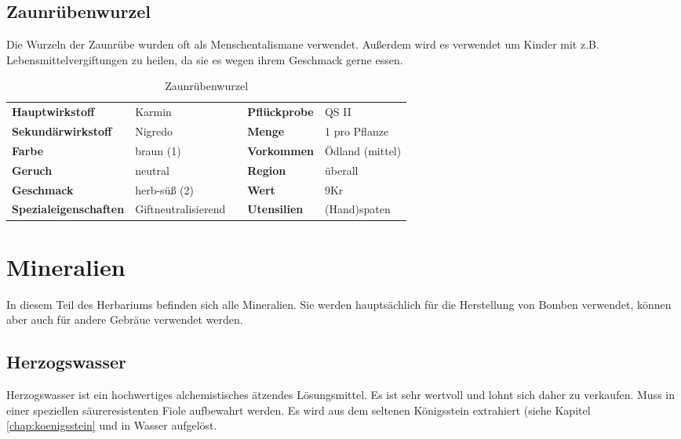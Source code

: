 \subsection{Zaunrübenwurzel}
Die Wurzeln der Zaunrübe wurden oft als Menschentalismane verwendet. Außerdem wird es verwendet um Kinder mit z.B. Lebensmittelvergiftungen zu heilen, da sie es wegen ihrem Geschmack gerne essen.

\begin{table}[H] 
\begin{center} 
\begin{tabular}{|l|l|p{1cm}|l|l|} 
  	\cline{1-2} \cline{4-5} 
  	\textbf{Hauptwirkstoff} & Karmin && \textbf{Pflückprobe} & QS II \\ \cline{1-2} \cline{4-5} 
  	\textbf{Sekundärwirkstoff} & Nigredo && \textbf{Menge} & 1 pro Pflanze \\ \cline{1-2} \cline{4-5} 
  	\textbf{Farbe} & braun (1) && \textbf{Vorkommen} & Ödland (mittel) \\ \cline{1-2} \cline{4-5} 
  	\textbf{Geruch} & neutral && \textbf{Region} & überall \\ \cline{1-2} \cline{4-5} 
  	\textbf{Geschmack} & herb-süß (2) && \textbf{Wert} & 9Kr \\ \cline{1-2} \cline{4-5} 
  	\textbf{Spezialeigenschaften} & Giftneutralisierend && \textbf{Utensilien} & (Hand)spaten \\ \cline{1-2} \cline{4-5} 
\end{tabular} 
\end{center} 
\caption{Zaunrübenwurzel} 
\label{tab:zaunruebenwurzel} 
\end{table}


\section{Mineralien}
In diesem Teil des Herbariums befinden sich alle Mineralien. Sie werden hauptsächlich für die Herstellung von Bomben verwendet, können aber auch für andere Gebräue verwendet werden.


\subsection{Herzogswasser}
Herzogswasser ist ein hochwertiges alchemistisches ätzendes Lösungsmittel. Es ist sehr wertvoll und lohnt sich daher zu verkaufen. Muss in einer speziellen säureresistenten Fiole aufbewahrt werden. Es wird aus dem seltenen Königsstein extrahiert (siehe Kapitel \ref{chap:koenigsstein} und in Wasser aufgelöst. 

